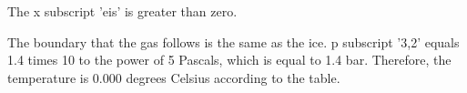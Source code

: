 The x subscript 'eis' is greater than zero.

The boundary that the gas follows is the same as the ice. p subscript '3,2' equals 1.4 times 10 to the power of 5 Pascals, which is equal to 1.4 bar. Therefore, the temperature is 0.000 degrees Celsius according to the table.